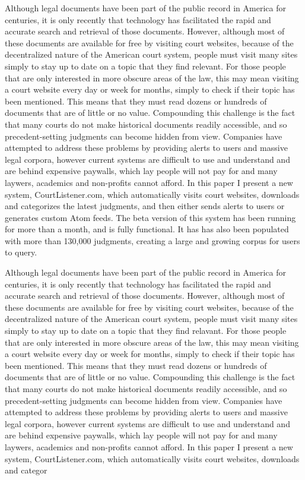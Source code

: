 Although legal documents have been part of the public record in America for centuries, it is only recently that technology has facilitated the rapid and accurate search and retrieval of those documents. However, although most of these documents are available for free by visiting court websites, because of the decentralized nature of the American court system, people must visit many sites simply to stay up to date on a topic that they find relevant. For those people that are only interested in more obscure areas of the law, this may mean visiting a court website every day or week for months, simply to check if their topic has been mentioned. This means that they must read dozens or hundreds of documents that are of little or no value. Compounding this challenge is the fact that many courts do not make historical documents readily accessible, and so precedent-setting judgments can become hidden from view. Companies have attempted to address these problems by providing alerts to users and massive legal corpora, however current systems are difficult to use and understand and are behind expensive paywalls, which lay people will not pay for and many laywers, academics and non-profits cannot afford. In this paper I present a new system, CourtListener.com, which automatically visits court websites, downloads and categorizes the latest judgments, and then either sends alerts to users or generates custom Atom feeds. The beta version of this system has been running for more than a month, and is fully functional. It has has also been populated with more than 130,000 judgments, creating a large and growing corpus for users to query.





Although legal documents have been part of the public record in America for centuries, it is only recently that technology has facilitated the rapid and accurate search and retrieval of those documents. However, although most of these documents are available for free by visiting court websites, because of the decentralized nature of the American court system, people must visit many sites simply to stay up to date on a topic that they find relavant. For those people that are only interested in more obscure areas of the law, this may mean visiting a court website every day or week for months, simply to check if their topic has been mentioned. 
This means that they must read dozens or hundreds of documents that are of little or no value. Compounding this challenge is the fact that many courts do not make historical documents readily accessible, and so precedent-setting judgments can become hidden from view. 
Companies have attempted to address these problems by providing alerts to users and massive legal corpora, however current systems are difficult to use and understand and are behind expensive paywalls, which lay people will not pay for and many laywers, academics and non-profits cannot afford. In this paper I present a new system, CourtListener.com, which automatically visits court websites, downloads and categor



